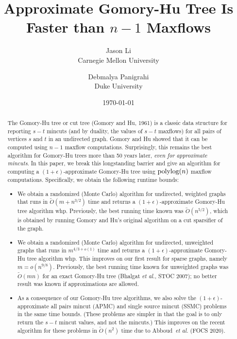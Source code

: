 \documentclass[11pt]{article}
\title{Approximate Gomory-Hu Tree Is Faster than $n-1$ Maxflows}
\author{{Jason Li\\Carnegie Mellon University} \and {Debmalya Panigrahi\\Duke University}}
\date{\today}
\newcommand{\e}{\epsilon}
\newcommand{\1}{\mathbbm 1}
\newcommand{\polylog}{\textup{polylog}}
\newcommand{\tO}{\tilde{O}}
\newcommand{\ssc}{{\sc SSMC}\xspace}
\newcommand{\apc}{{\sc APMC}\xspace}
\begin{document}
\maketitle

\begin{abstract}
    The Gomory-Hu tree or cut tree (Gomory and Hu, 1961) is a classic data structure for reporting $s-t$ mincuts (and by duality, the values of $s-t$ maxflows) for all pairs of vertices $s$ and $t$ in an undirected graph. Gomory and Hu showed that it can be computed using $n-1$ maxflow computations. Surprisingly, this remains the best algorithm for Gomory-Hu trees more than 50 years later, {\em even for approximate mincuts}. In this paper, we break this longstanding barrier and give an algorithm for computing a $(1+\e)$-approximate Gomory-Hu tree using $\polylog(n)$ maxflow computations. Specifically, we obtain the following runtime bounds:
    \begin{itemize}
        \item We obtain a randomized (Monte Carlo) algorithm for undirected, weighted graphs that runs in $\tO(m + n^{3/2})$ time and returns a $(1+\e)$-approximate Gomory-Hu tree algorithm whp. Previously, the best running time known was $\tO(n^{5/2})$, which is obtained by running Gomory and Hu's original algorithm on a cut sparsifier of the graph.
        \item We obtain a randomized (Monte Carlo) algorithm for undirected, unweighted graphs that runs in $m^{4/3+o(1)}$ time and returns a $(1+\e)$-approximate Gomory-Hu tree algorithm whp. This improves on our first result for sparse graphs, namely $m = o(n^{9/8})$. Previously, the best running time known for unweighted graphs was $\tO(mn)$ for an exact Gomory-Hu tree (Bhalgat {\em et al.}, STOC 2007); no better result was known if approximations are allowed.
        \item As a consequence of our Gomory-Hu tree algorithms, we also solve the $(1+\e)$-approximate all pairs mincut (\apc) and single source mincut (\ssc) problems in the same time bounds. (These problems are simpler in that the goal is to only return the $s-t$ mincut values, and not the mincuts.) This improves on the recent algorithm for these problems in $\tO(n^2)$ time due to Abboud~{\em et al.} (FOCS 2020).
    \end{itemize}
\end{abstract}


\clearpage
\end{document}
